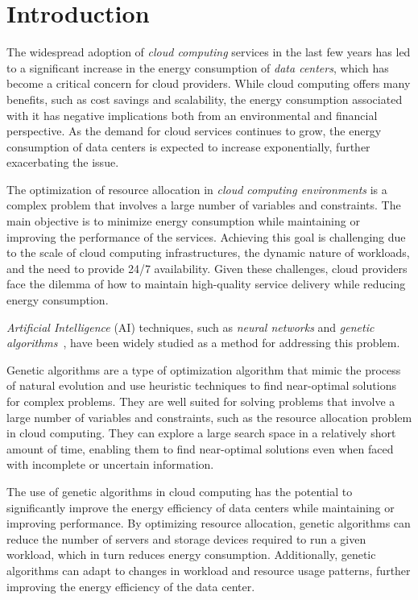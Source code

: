\section{Introduction}\label{sect:intro}


The widespread adoption of \textit{cloud computing} services in the last few years has led to a significant increase in the energy consumption 
of \textit{data centers}, which has become a critical concern for cloud providers. 
While cloud computing offers many benefits, such as cost savings and scalability, 
the energy consumption associated with it has negative implications both from an environmental and financial perspective. 
As the demand for cloud services continues to grow, the energy consumption of data centers is expected to increase exponentially, 
further exacerbating the issue.

The optimization of resource allocation in \textit{cloud computing environments} is a complex problem that involves a large number of variables and constraints. 
The main objective is to minimize energy consumption while maintaining or improving the performance of the services. 
Achieving this goal is challenging due to the scale of cloud computing infrastructures, the dynamic nature of workloads, and the need to provide 24/7 availability. 
Given these challenges, cloud providers face the dilemma of how to maintain high-quality service delivery while reducing energy consumption.~\cite{yusoh2012composite}

\textit{Artificial Intelligence} (AI) techniques, such as \textit{neural networks} and \textit{genetic algorithms}~\cite{mitchell1998introduction, yusoh2012composite, rafique2011cloud, nzanywayingoma2017effective}, 
have been widely studied as a method for addressing this problem. 

Genetic algorithms are a type of optimization algorithm that mimic the process of natural evolution and use heuristic techniques to find near-optimal solutions 
for complex problems. They are well suited for solving problems that involve a large number of variables and constraints, 
such as the resource allocation problem in cloud computing. 
They can explore a large search space in a relatively short amount of time, enabling them to find near-optimal solutions even 
when faced with incomplete or uncertain information.~\cite{forrest1996genetic}

The use of genetic algorithms in cloud computing has the potential to significantly improve the energy efficiency of data centers while maintaining or improving performance. 
By optimizing resource allocation, genetic algorithms can reduce the number of servers and storage devices required to run a given workload, 
which in turn reduces energy consumption. Additionally, genetic algorithms can adapt to changes in workload and resource usage patterns, 
further improving the energy efficiency of the data center.

